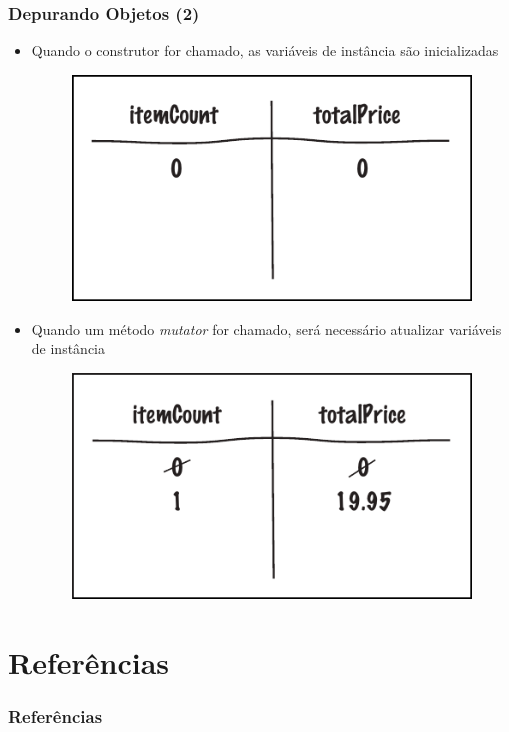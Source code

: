 \documentclass[xcolor={dvipsnames,table},aspectratio=169]{beamer}
\begin{document}
\begin{frame}\frametitle{Depurando Objetos (2)}
\begin{itemize}
	\item Quando o construtor for chamado, as variáveis de instância são inicializadas
\begin{figure}[h]
	\includegraphics[height=0.25\paperheight,center]{pucrs-ep-fprog-unidade_07-objetos_e_classes-laminas-depurando_objetos_1.png}
\end{figure}
	\item Quando um método \emph{mutator} for chamado, será necessário atualizar variáveis de instância
\begin{figure}[h]
	\includegraphics[height=0.25\paperheight,center]{pucrs-ep-fprog-unidade_07-objetos_e_classes-laminas-depurando_objetos_2.png}
\end{figure}
\end{itemize}
\end{frame}

\section{Referências}

\begin{frame}\frametitle{Referências}
\end{frame}

\end{document}
